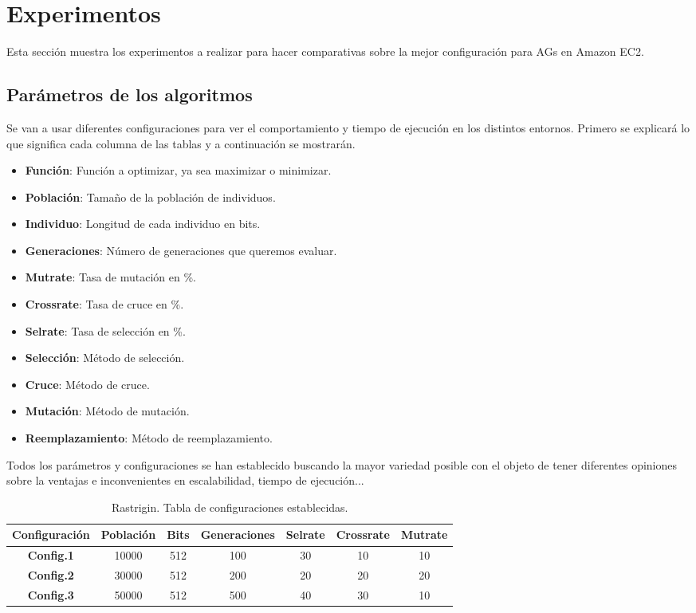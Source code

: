 \documentclass[runningheads]{llncs}
\begin{document}
\section{Experimentos}
\label{sec:experimentos}
Esta sección muestra los experimentos a realizar para hacer comparativas sobre la mejor configuración para AGs en Amazon EC2.

\subsection{Parámetros de los algoritmos}

Se van a usar diferentes configuraciones para ver el comportamiento y tiempo de ejecución en los distintos entornos. 
Primero se explicará lo que significa cada columna de las tablas y a continuación se mostrarán.

\begin{itemize}
 \item \textbf{Función}: Función a optimizar, ya sea maximizar o minimizar.
 \item \textbf{Población}: Tamaño de la población de individuos.
 \item \textbf{Individuo}: Longitud de cada individuo en bits.
 \item \textbf{Generaciones}: Número de generaciones que queremos evaluar.
 \item \textbf{Mutrate}: Tasa de mutación en \%.
 \item \textbf{Crossrate}: Tasa de cruce en \%.
 \item \textbf{Selrate}: Tasa de selección en \%.
 \item \textbf{Selección}: Método de selección.
 \item \textbf{Cruce}: Método de cruce.
 \item \textbf{Mutación}: Método de mutación.
 \item \textbf{Reemplazamiento}: Método de reemplazamiento.
\end{itemize}

Todos los parámetros y configuraciones se han establecido buscando la mayor variedad posible con el objeto de tener diferentes 
opiniones sobre la ventajas e inconvenientes en  escalabilidad, tiempo de ejecución...

\begin{table}[htb]

  \begin{tabular}{|| c | c | c | c |c | c | c ||}
    \hline
    \textbf{Configuración} & \textbf{Población} & \textbf{Bits} & \textbf{Generaciones} &
    \textbf{Selrate} & \textbf{Crossrate} & \textbf{Mutrate}  \\

    \hline
    \textbf{Config.1} & 10000 & 512 & 100 & 30 & 10 & 10 \\
    \hline
    \textbf{Config.2} & 30000 & 512 & 200 & 20 & 20 & 20 \\
    \hline
    \textbf{Config.3} & 50000 & 512 & 500 & 40 & 30 & 10 \\
    \hline
  \end{tabular}
  \caption{Rastrigin. Tabla de configuraciones establecidas.} 
  \label{TablaParametrosRastrigin}
\end{table}
\end{document}
